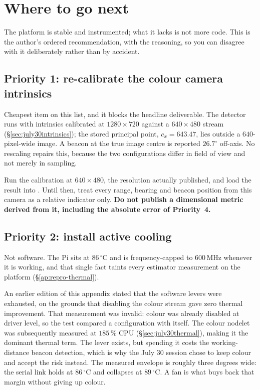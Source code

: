 \section{Where to go next}
\label{ap:repro-next}
The platform is stable and instrumented; what it lacks is not more code. This
is the author's ordered recommendation, with the reasoning, so you can disagree
with it deliberately rather than by accident.

\subsection{Priority 1: re-calibrate the colour camera intrinsics}
\label{ap:next-intrinsics}
Cheapest item on this list, and it blocks the headline deliverable. The
detector runs with intrinsics calibrated at $1280\times720$ against a
$640\times480$ stream (\S\ref{sec:july30intrinsics}); the stored principal
point, $c_x = 643.47$, lies outside a $640$-pixel-wide image. A beacon at the
true image centre is reported $26.7^\circ$ off-axis. No rescaling repairs
this, because the two configurations differ in field of view and not merely in
sampling.

Run the calibration at $640\times480$, the resolution actually published,
and load the result into . Until then, treat
every range, bearing and beacon position from this camera as a relative
indicator only. \textbf{Do not publish a dimensional metric derived from it,
including the absolute error of Priority~4.}

\subsection{Priority 2: install active cooling}
Not software. The Pi sits at $86\,^\circ$C and is frequency-capped to
$600$\,MHz whenever it is working, and that single fact taints every estimator
measurement on the platform (\S\ref{ap:repro-thermal}).

An earlier edition of this appendix stated that the software levers were
exhausted, on the grounds that disabling the colour stream gave zero thermal
improvement. That measurement was invalid: colour was already disabled at
driver level, so the test compared a configuration with itself. The colour
nodelet was subsequently measured at $185\,\%$ CPU
(\S\ref{sec:july30thermal}), making it the dominant thermal term. The lever
exists, but spending it costs the working-distance beacon detection, which
is why the July 30 session chose to keep colour and accept the risk instead.
The measured envelope is roughly three degrees wide: the serial link holds at
$86\,^\circ$C and collapses at $89\,^\circ$C. A fan is what buys back that
margin without giving up colour.

